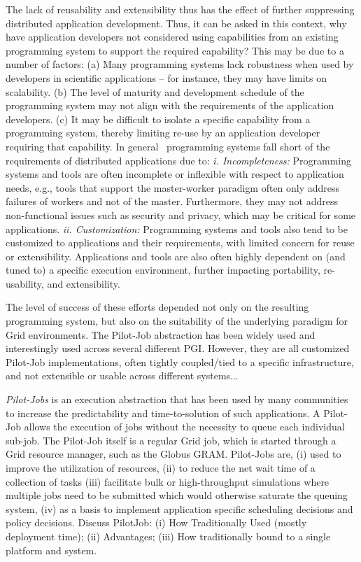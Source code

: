 \documentclass[conference,final]{IEEEtran}
\begin{document}
The lack of reusability and extensibility thus has the effect of
further suppressing distributed application development. Thus, it can
be asked in this context, why have application developers not
considered using capabilities from an existing programming system to
support the required capability? This may be due to a number of
factors: (a) Many programming systems lack robustness when used by
developers in scientific applications -- for instance, they may have
limits on scalability. (b) The level of maturity and development
schedule of the programming system may not align with the requirements
of the application developers. (c) It may be difficult to isolate a
specific capability from a programming system, thereby limiting re-use
by an application developer requiring that capability. In
general~\cite{dpagrid2009} programming systems fall short of the
requirements of distributed applications due to: {\em
  i. Incompleteness:} Programming systems and tools are often
incomplete or inflexible with respect to application needs, e.g.,
tools that support the master-worker paradigm often only address
failures of workers and not of the master. Furthermore, they may not
address non-functional issues such as security and privacy, which may
be critical for some applications.  {\em ii. Customization:}
Programming systems and tools also tend to be customized to
applications and their requirements, with limited concern for reuse or
extensibility.  Applications and tools are also often highly dependent
on (and tuned to) a specific execution environment, further impacting
portability, re-usability, and extensibility.

The level of success of these efforts depended not only on the
resulting programming system, but also on the suitability of the
underlying paradigm for Grid environments. The Pilot-Job abstraction
has been widely used and interestingly used across several different
PGI. However, they are all customized Pilot-Job implementations, often
tightly coupled/tied to a specific infrastructure, and not extensible
or usable across different systems...

\emph{Pilot-Jobs} is an execution abstraction that has been used by
many communities to increase the predictability and time-to-solution
of such applications. A Pilot-Job allows the execution of jobs without
the necessity to queue each individual sub-job. The Pilot-Job itself
is a regular Grid job, which is started through a Grid resource
manager, such as the Globus GRAM.  Pilot-Jobs are, (i) used to improve
the utilization of resources, (ii) to reduce the net wait time of a
collection of tasks (iii) facilitate bulk or high-throughput
simulations where multiple jobs need to be submitted which would
otherwise saturate the queuing system, (iv) as a basis to implement
application specific scheduling decisions and policy decisions.
Discuss PilotJob: (i) How Traditionally Used (mostly deployment time);
(ii) Advantages; (iii) How traditionally bound to a single platform
and system.
\end{document}
